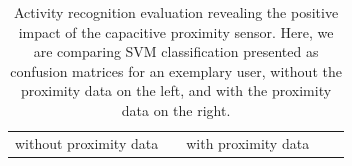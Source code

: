 \documentclass[runningheads,a4paper]{llncs}
\begin{document}
\begin{table}
	\caption{Activity recognition evaluation revealing the positive impact of the capacitive proximity sensor. Here, we are comparing SVM classification presented as confusion matrices for an exemplary user, without the proximity data on the left, and with the proximity data on the right.}
	
	\setlength{\tabcolsep}{2.4pt}
	\centering
	
	\begin{scriptsize}
	\begin{tabular}%
	{|ccccccccc|p{0.01cm}|ccccccccc|p{0.01cm}|l}
		\multicolumn{9}{c}{without proximity data} &\multicolumn{1}{c}{}& 
			\multicolumn{9}{c}{with proximity data} &\multicolumn{1}{c}{}&  \\ \cmidrule{1-9} \cmidrule{11-19} 
			

\end{tabular}
\end{scriptsize}
\end{table}
\end{document}
